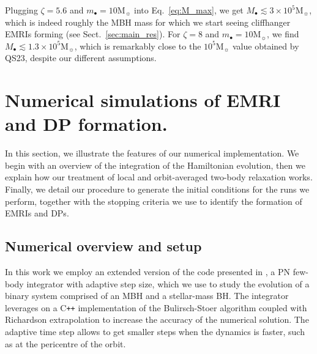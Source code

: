 \documentclass[desactivate]{aa}
\begin{document}
        Plugging $\zeta=5.6$ and $m_\bullet = 10 \mathrm{M}_\sun$ into Eq.\ \eqref{eq:M_max}, we get $M_\bullet \lesssim 3 \times 10^5 \mathrm{M}_\sun$, which is indeed roughly the MBH mass for which we start seeing cliffhanger EMRIs forming (see Sect.\ \ref{sec:main_res}).
        For $\zeta=8$ and $m_\bullet = 10 \mathrm{M}_\sun$, we find $M_\bullet \lesssim 1.3 \times 10^5 \mathrm{M}_\sun$, which is remarkably close to the $10^5 \mathrm{M}_\sun$ value obtained by QS23, despite our different assumptions. 
        

\section{Numerical simulations of EMRI and DP formation.} \label{sec:methods}

    In this section, we illustrate the features of our numerical implementation. We begin with an overview of the integration of the Hamiltonian evolution, then we explain how our treatment of local and orbit-averaged two-body relaxation works. Finally, we detail our procedure to generate the initial conditions for the runs we perform, together with the stopping criteria we use to identify the formation of EMRIs and DPs.

    \subsection{Numerical overview and setup} \label{sec:setup}

        In this work we employ an extended version of the code presented in \citet{2016MNRAS.461.4419B}, a PN few-body integrator with adaptive step size, which we use to study the evolution of a binary system comprised of an MBH and a stellar-mass BH. The integrator leverages on a C\texttt{++} implementation of the Bulirsch-Stoer algorithm \citep{Bulirsch1966} coupled with Richardson extrapolation \citep{1911RSPTA.210..307R} to increase the accuracy of the numerical solution. The adaptive time step allows to get smaller steps when the dynamics is faster, such as at the pericentre of the orbit.
\end{document}

